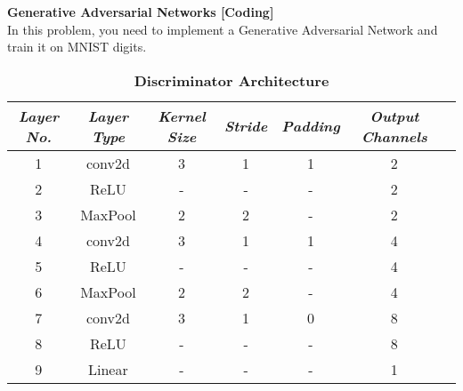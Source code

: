 \begin{Q}
\textbf{\Large Generative Adversarial Networks [Coding]}\\

In this problem, you need to implement a Generative Adversarial Network and train it on MNIST digits.

\begin{table}[h]
\begin{center}
\caption{\textbf{Discriminator Architecture}}
\label{GAN: dis}
\begin{tabular}{ccccccc}
\toprule
{\small\textit{Layer No.}}
  & {\small \textit{Layer Type}}
  & {\small \textit{Kernel Size}}
  & {\small \textit{Stride}}
  & {\small \textit{Padding}}
  & {\small \textit{Output Channels}} \\
\midrule
1 & conv2d   & 3 & 1 & 1 & 2 \\
2 & ReLU     & - & - & - & 2 \\
3 & MaxPool  & 2 & 2 & - & 2 \\
4 & conv2d   & 3 & 1 & 1 & 4 \\
5 & ReLU     & - & - & - & 4 \\
6 & MaxPool  & 2 & 2 & - & 4 \\
7 & conv2d   & 3 & 1 & 0 & 8 \\
8 & ReLU     & - & - & - & 8 \\
9 & Linear   & - & - & - & 1 \\
\bottomrule
\end{tabular}
\end{center}
\end{table}


\end{Q}

